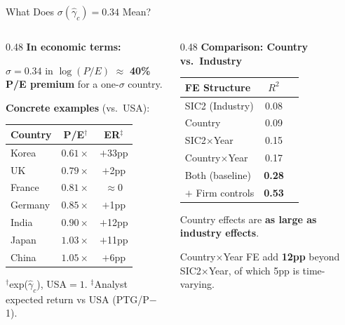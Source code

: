 \documentclass[aspectratio=169, 11pt]{beamer}
\begin{document}
\begin{frame}{What Does $\sigma(\hat\gamma_c) = 0.34$ Mean?}
\vspace{-0.1cm}
\begin{columns}[T]
\begin{column}{0.48\textwidth}
\footnotesize
\textbf{In economic terms:}
\vspace{0.1cm}

$\sigma = 0.34$ in $\log(P/E)$ $\approx$ \textcolor{alert}{\textbf{40\% P/E premium}} for a one-$\sigma$ country.

\vspace{0.15cm}
\textbf{Concrete examples} (vs.\ USA):
\renewcommand{\arraystretch}{0.90}
\begin{tabular}{@{}lcc@{}}
\toprule
Country & P/E$^\dagger$ & ER$^\ddagger$ \\
\midrule
Korea & \textcolor{alert}{$0.61\times$} & $+$33pp \\
UK & $0.79\times$ & $+$2pp \\
France & $0.81\times$ & $\approx 0$ \\
Germany & $0.85\times$ & $+$1pp \\
India & $0.90\times$ & $+$12pp \\
Japan & $1.03\times$ & $+$11pp \\
China & $1.05\times$ & $+$6pp \\
\bottomrule
\end{tabular}

\vspace{0.05cm}
\scriptsize $^\dagger$exp($\hat\gamma_c$), USA$=1$. \; $^\ddagger$Analyst expected return vs USA (PTG/P$-$1).
\renewcommand{\arraystretch}{1.0}
\end{column}
\begin{column}{0.48\textwidth}
\footnotesize
\textbf{Comparison: Country vs.\ Industry}

\vspace{0.1cm}
\renewcommand{\arraystretch}{0.95}
\begin{tabular}{@{}lcc@{}}
\toprule
\textbf{FE Structure} & $R^2$ \\
\midrule
SIC2 (Industry) & 0.08 \\
Country & 0.09 \\
SIC2$\times$Year & 0.15 \\
Country$\times$Year & 0.17 \\
\midrule
Both (baseline) & \textbf{0.28} \\
$+$ Firm controls & \textbf{0.53} \\
\bottomrule
\end{tabular}
\renewcommand{\arraystretch}{1.0}

\vspace{0.15cm}
Country effects are \textbf{as large as industry effects}.

\vspace{0.1cm}
Country$\times$Year FE add \textbf{12pp} beyond SIC2$\times$Year, of which 5pp is time-varying.
\end{column}
\end{columns}
\end{frame}
\end{document}
